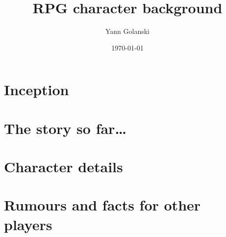\documentclass[a4paper,twoside,twocolumn,10pt,bringhurst]{memoir}
\title{RPG character background}
\date{\today}
\author{Yann Golanski}
\begin{document}
\frontmatter
\maketitle
\tableofcontents

\mainmatter

\chapter{Inception}



\lipsum[1]

\lipsum[2]

\lipsum[3]

\lipsum[4]

\lipsum[5]

\lipsum[6]

\chapter{The story so far\ldots}



\chapter{Character details}

\chapter{Rumours and facts for other players}

\end{document}
